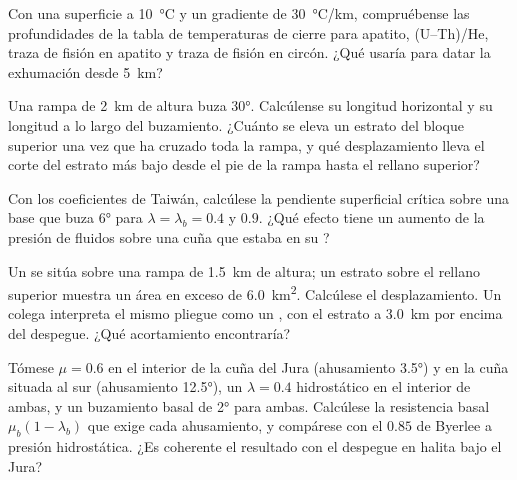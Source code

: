 \begin{exercise}[$\star$]\label{exo:b3:orogenic-wedges:3}
Con una superficie a \qty{10}{\celsius} y un gradiente de \qty{30}{\celsius/km},
compruébense las profundidades de la tabla de temperaturas de cierre para apatito,
(U--Th)/He, traza de fisión en apatito y traza de fisión en circón. ¿Qué
 usaría para datar la exhumación desde \qty{5}{km}?
\end{exercise}

\begin{exercise}[$\star$]\label{exo:b3:orogenic-wedges:4}
Una rampa de \qty{2}{km} de altura buza \ang{30}. Calcúlense su longitud horizontal y su
longitud a lo largo del buzamiento. ¿Cuánto se eleva un estrato del bloque superior una vez
que ha cruzado toda la rampa, y qué desplazamiento lleva el corte del estrato más bajo
desde el pie de la rampa hasta el rellano superior?
\end{exercise}

\begin{exercise}[$\star\star$]\label{exo:b3:orogenic-wedges:5}
Con los coeficientes de Taiwán, calcúlese la pendiente superficial crítica sobre una base
que buza \ang{6} para $\lambda = \lambda_b = 0.4$ y $0.9$. ¿Qué efecto tiene un
aumento de la presión de fluidos sobre una cuña que estaba en su ?
\end{exercise}

\begin{exercise}[$\star\star$]\label{exo:b3:orogenic-wedges:6}
Un  se sitúa sobre una rampa de \qty{1.5}{km} de altura; un estrato sobre el
rellano superior muestra un área en exceso de \qty{6.0}{km^2}. Calcúlese el desplazamiento. Un colega
interpreta el mismo pliegue como un , con el estrato a \qty{3.0}{km} por encima
del despegue. ¿Qué acortamiento encontraría?
\end{exercise}

\begin{exercise}[$\star\star$]\label{exo:b3:orogenic-wedges:7}
Tómese $\mu = 0.6$ en el interior de la cuña del Jura (ahusamiento \ang{3.5}) y en la cuña situada al
sur (ahusamiento \ang{12.5}), un $\lambda = 0.4$ hidrostático en el interior de ambas, y un
buzamiento basal de \ang{2} para ambas. Calcúlese la resistencia basal $\mu_b(1 -
\lambda_b)$ que exige cada ahusamiento, y compárese con el $0.85$ de Byerlee
a presión hidrostática. ¿Es coherente el resultado con el despegue en halita
bajo el Jura?
\end{exercise}

